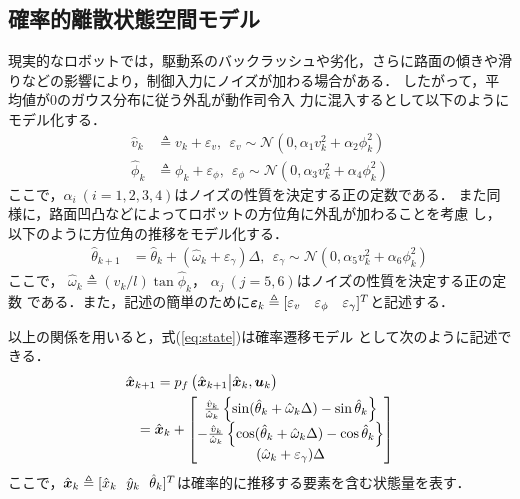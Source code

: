 \documentclass[a4paper,10pt,twocolumn,fleqn]{jsarticle}
\def\vec#1{\mbox{\boldmath$#1$}}
\def\vec#1{\mbox{\boldmath$#1$}}
\begin{document}
\subsection{確率的離散状態空間モデル}
\vspace{-2mm}
現実的なロボットでは，駆動系のバックラッシュや劣化，さらに路面の傾きや滑
りなどの影響により，制御入力にノイズが加わる場合がある．
%
したがって，平均値が0のガウス分布に従う外乱が動作司令入
力に混入するとして以下のようにモデル化する\cite{p-robo}．
\begin{align}
 \hat{v}_k&\triangleq v_k+\varepsilon_v, \ \ 
 \varepsilon_v \sim 
 \mathcal{N} (0,\alpha_{1} v^2_k+\alpha_2 \phi^2_k) \\
 \hat{\phi}_k&\triangleq \phi_k+\varepsilon_{\phi}, \ \ \varepsilon_\phi \sim
 \mathcal{N}(0,\alpha_3 v^2_k+\alpha_4\phi^2_k) 
\end{align}
ここで，$\alpha_i~(i=1,2,3,4)$はノイズの性質を決定する正の定数である．
%
また同様に，路面凹凸などによってロボットの方位角に外乱が加わることを考慮
し，以下のように方位角の推移をモデル化する．
\begin{align*}
 \hat{\theta}_{k+1}
 &=\hat{\theta}_{k}+(\hat{\omega}_k +\varepsilon_\gamma)\Delta, \ \
 \varepsilon_\gamma\sim 
 \mathcal{N}(0,\alpha_5 v^2_k+\alpha_6 \phi^2_k )
\end{align*}
ここで，
$\hat{\omega}_k\triangleq (\hat{v}_k/l)\tan\hat{\phi}_k$，
$\alpha_j~(j=5,6)$はノイズの性質を決定する正の定数
である．また，記述の簡単のために$\vec{\varepsilon}_k\triangleq
[
\begin{matrix}
 \varepsilon_v& \varepsilon_\phi& \varepsilon_\gamma 
\end{matrix}
]^T$と記述する．

以上の関係を用いると，式(\ref{eq:state})は確率遷移モデル
として次のように記述できる．
\begin{align}
 \hat{\vec{x}}_{k+1}
&=p_f\left(\hat{\vec{x}}_{k+1} \big\vert
 \hat{\vec{x}}_k, \vec{u}_k \right)\nonumber\\
&\hspace{-5mm}= \hat{\vec{x}}_{k}+\left[
  \begin{matrix}
   \frac{\hat{v}_k}{\hat{\omega}_k}
   \left\{\sin(\hat{\theta}_{k}
   +\hat{\omega}_k\Delta)
   -\sin\hat{\theta}_{k}\right\}\\
   -\frac{\hat{v}_k}{\hat{\omega}_k}
   \left\{\cos(\hat{\theta}_{k}
   +\hat{\omega}_k\Delta)
   -\cos\hat{\theta}_{k}\right\}\\
   (\hat{\omega}_k+\varepsilon_\gamma)\Delta
  \end{matrix}
 \right]
 \label{eqn:prob}
\end{align}
ここで，$\hat{\vec{x}}_{k}\triangleq [\hat{x}_k\ \ \hat{y}_k\ \
\hat{\theta}_k]^T$は確率的に推移する要素を含む状態量を表す．
\vspace{-2mm}
\end{document}
